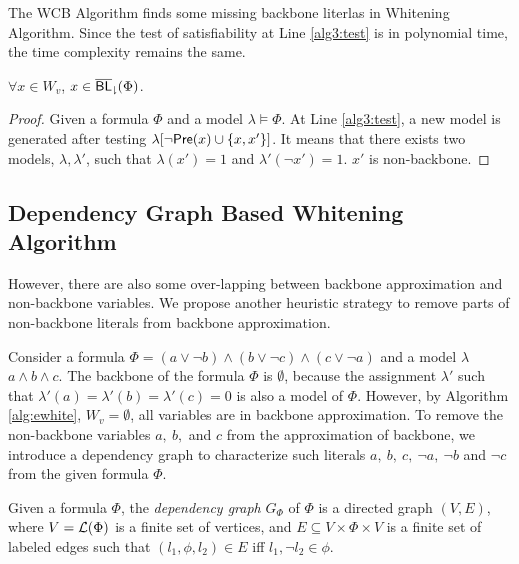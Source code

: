 The WCB Algorithm finds some missing backbone literlas in Whitening Algorithm. Since the test of satisfiability at Line \ref{alg3:test} is in polynomial time, the time complexity remains the same.

\begin{theorem}
$\forall x\in W_v$, $x\in{\sf \overline{BL}_\downharpoonright}(\Phi)$.
\end{theorem}

\begin{proof}
Given a formula $\Phi$ and a model $\lambda\models\Phi$. At Line \ref{alg3:test}, a new model is generated after testing $\lambda[\neg \textsf{Pre}(x)\cup \{x,x'\}]$. It means that there exists two models, $\lambda,\lambda'$, such that $\lambda(x')=1$ and $\lambda'(\neg x')=1$. $x'$ is non-backbone.
\end{proof}
\medskip


\iffalse
\subsection{Dependency Graph Based Whitening Algorithm}

However, there are also some over-lapping between backbone approximation and non-backbone variables. We propose another heuristic strategy to remove parts of non-backbone literals from backbone approximation.

Consider a formula $\Phi=(a\vee\neg b)\wedge(b\vee\neg c)\wedge(c\vee\neg a)$ and a model $\lambda$ $a\wedge b\wedge c$. The backbone of the formula $\Phi$ is $\emptyset$, because the assignment $\lambda'$ such that $\lambda'(a)=\lambda'(b)=\lambda'(c)=0$ is also a model of $\Phi$.
However, by Algorithm \ref{alg:ewhite}, $W_v=\emptyset$, all variables are in backbone approximation. To remove the non-backbone variables $a, \ b, $ and $c$ from the approximation of backbone, we introduce a dependency graph to characterize such literals $a, \ b, \ c, \ \neg a, \ \neg b$ and  $\neg c$ from  the given formula $\Phi$.

Given a formula $\Phi$, the \emph{dependency graph} $G_\Phi$ of $\Phi$ is a directed graph $(V,E)$, where
$V=\Lit(\Phi)$ is a finite set of vertices, and $E\subseteq V\times \Phi\times V$ is a finite set of labeled edges such that
$(l_1,\phi, l_2)\in E$ iff $l_1,\neg l_2\in \phi$.

